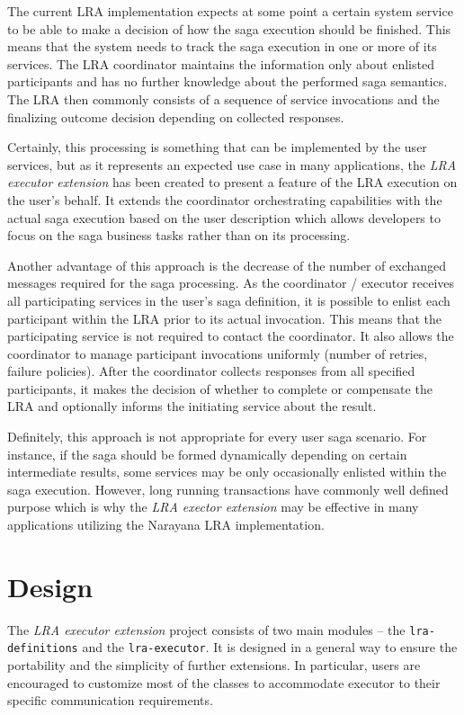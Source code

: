 \documentclass[oneside,
  digital, %
  table,   %
  nolof,     %
  nolot,     %
]{fithesis3}
\begin{document}
The current LRA implementation expects at some point a certain system service to be able to make a decision of how the saga execution should be finished. This means that the system needs to track the saga execution in one or more of its services. The LRA coordinator maintains the information only about enlisted participants and has no further knowledge about the performed saga semantics. The LRA then commonly consists of a sequence of service invocations and the finalizing outcome decision depending on collected responses.

Certainly, this processing is something that can be implemented by the user services, but as it represents an expected use case in many applications, the \textit{LRA executor extension} has been created to present a feature of the LRA execution on the user's behalf. It extends the coordinator orchestrating capabilities with the actual saga execution based on the user description which allows developers to focus on the saga business tasks rather than on its processing.

Another advantage of this approach is the decrease of the number of exchanged messages required for the saga processing. As the coordinator / executor receives all participating services in the user's saga definition, it is possible to enlist each participant within the LRA prior to its actual invocation. This means that the participating service is not required to contact the coordinator. It also allows the coordinator to manage participant invocations uniformly (number of retries, failure policies). After the coordinator collects responses from all specified participants, it makes the decision of whether to complete or compensate the LRA and optionally informs the initiating service about the result.

Definitely, this approach is not appropriate for every user saga scenario. For instance, if the saga should be formed dynamically depending on certain intermediate results, some services may be only occasionally enlisted within the saga execution. However, long running transactions have commonly well defined purpose which is why the \textit{LRA exector extension} may be effective in many applications utilizing the Narayana LRA implementation.

\section{Design}
\label{sec:extension-design}

The \textit{LRA executor extension} project consists of two main modules -- the \texttt{lra-definitions} and the \texttt{lra-executor}. It is designed in a general way to ensure the portability and the simplicity of further extensions. In particular, users are encouraged to customize most of the classes to accommodate executor to their specific communication requirements.
\end{document}
